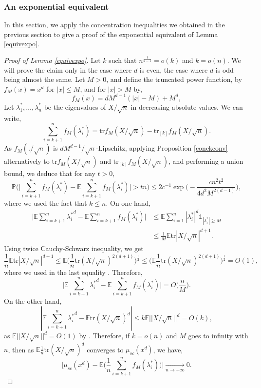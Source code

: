 \documentclass[aop,preprint]{imsart}
\newcommand\PP{\mathbb{P}}
\newcommand\EE{\mathbb{E}}
\newcommand\tr{\mathrm{tr}}
\newcommand\Car{\mathds{1}}
\numberwithin{equation}{section}
\theoremstyle{definition}
\theoremstyle{plain}
\theoremstyle{remark}
\begin{document}
\subsubsection{An exponential equivalent}
In this section, we apply the concentration inequalities we obtained in the previous section to give a proof of the exponential equivalent of Lemma \ref{equivexpo}.
\begin{proof}[Proof of Lemma \ref{equivexpo}]Let $k$ such that  $n^{\frac{1}{d-1}} = o(k)$ and $k=o(n)$. We will prove the claim only in the case where $d$ is even, the case where $d$ is odd being almost the same.
Let $M>0$, and define the truncated power function, by $f_M(x) = x^d$ for $|x|\leq M$, and for $|x|>M$ by,
$$f_M(x) = 
dM^{d-1}(|x|-M) +M^d,$$
Let $\lambda^*_1,\ldots,\lambda^*_n$ be the eigenvalues of $X/\sqrt{n}$ in decreasing absolute values. We can write,
$$ \sum_{i=k+1}^n f_M(\lambda_i^*) = \tr f_M(X/\sqrt{n}) - \tr_{[k]} f_M(X/\sqrt{n}).$$
As $f_M(./\sqrt{n})$ is $dM^{d-1}/\sqrt{n}$-Lipschitz, applying Proposition \ref{conckconv} alternatively to $\tr f_M(X/\sqrt{n})$ and $\tr_{[k]} f_M(X/\sqrt{n})$, and performing a union bound, we deduce that for any $t>0$,
\begin{equation} \label{conctrunc} \PP\Big( \big|\sum_{i=k+1}^{n} f_M(\lambda_i^*)  - \EE \sum_{i=k+1}^{n} f_M(\lambda_i^*)  \big| >tn \Big) \leq 2c^{-1}\exp\Big( - \frac{c n^2 t^2}{4d^2 M^{2(d-1)}}\Big),\end{equation}
where we used the fact that $k\leq n$. On one hand,
\begin{align*}
\big|\EE \sum_{i=k+1}^{n} {\lambda_i^*}^d -  \EE \sum_{i=k+1}^{n} f_M(\lambda_i^*)\big|& \leq  \EE \sum_{i=1}^n |\lambda_i^*|^d \Car_{|\lambda_i^*|\geq M} \\
&\leq \frac{1}{M}\EE \tr |X/\sqrt{n}|^{d+1}.
\end{align*} 
 Using twice Cauchy-Schwarz inequality, we get
$$  \frac{1}{n} \EE \tr |X/\sqrt{n}|^{d+1} \leq \EE \big(\frac{1}{n}\tr (X/\sqrt{n})^{2(d+1)}\big)^{\frac{1}{2}} \leq  \big(\EE\frac{1}{n}\tr (X/\sqrt{n})^{2(d+1)}\big)^{\frac{1}{2}}=O(1),$$
where we used in the last equality \cite[Lemma 2.1.6]{AGZ}. Therefore,
$$ \big|\EE \sum_{i=k+1}^{n} {\lambda_i^*}^d -  \EE \sum_{i=k+1}^{n} f_M(\lambda_i^*)\big|=O\Big(\frac{n}{M}\Big).$$
On the other hand,
$$ |\EE\sum_{i=k+1}^{n} {\lambda_i^*}^d - \EE \tr (X/\sqrt{n})^d |\leq k\EE || X/\sqrt{n}||^d = O(k),$$
as $\EE || X/\sqrt{n}||^d =O(1)$ by \cite[Exercice 2.1.27]{AGZ}. 
Therefore, if $k=o(n)$ and $M$ goes to infinity with $n$, then as  $\EE \frac{1}{n} \tr (X/\sqrt{n})^d$ converges to $\mu_{sc}(x^d)$, we have,
\begin{equation} \label{convertr}\big|\mu_{sc}(x^d) -  \EE\Big( \frac{1}{n} \sum_{i=k+1}^{n} f_M(\lambda_i^*)\Big)\big|
\underset{n\to +\infty}{\longrightarrow} 0.\end{equation}


\end{proof}
\end{document}
